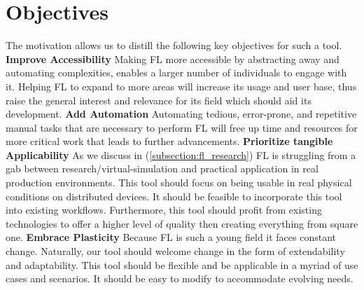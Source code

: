 \section{Objectives}

The motivation allows us to distill the following key objectives for such a tool.
\vspace{5mm}
\newline
\textbf{Improve Accessibility}\newline
Making FL more accessible by abstracting away and automating complexities,
enables a larger number of individuals to engage with it.
Helping FL to expand to more areas will increase its usage and user base,
thus raise the general interest and relevance for its field which should aid its development.
\vspace{5mm}
\newline
\textbf{Add Automation}\newline
Automating tedious, error-prone, and repetitive manual tasks that are necessary
to perform FL will free up time and resources for more critical work that leads
to further advancements.
\vspace{5mm}
\newline
\textbf{Prioritize tangible Applicability}\newline
As we discuss in (\ref{subsection:fl_research}) FL is struggling from a gab
between research/virtual-simulation and practical application in real production environments.
This tool should focus on being usable in real physical conditions on distributed devices.
It should be feasible to incorporate this tool into existing workflows.
Furthermore, this tool should profit from existing technologies to offer a higher
level of quality then creating everything from square one.
\vspace{5mm}
\newline
\textbf{Embrace Plasticity}\newline
Because FL is such a young field it faces constant change.
Naturally, our tool should welcome change in the form of extendability
and adaptability.
This tool should be flexible and be applicable in a myriad of use cases and scenarios.
It should be easy to modify to accommodate evolving needs.